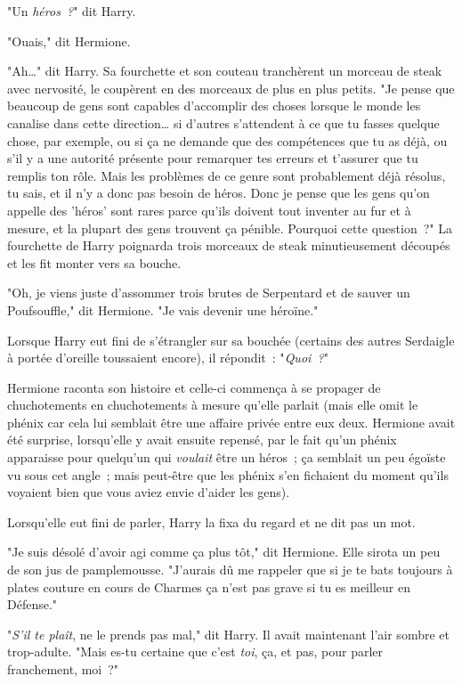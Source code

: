 "Un \emph{héros~?}" dit Harry.

"Ouais," dit Hermione.

"Ah…" dit Harry. Sa fourchette et son couteau tranchèrent un morceau de steak avec nervosité, le coupèrent en des morceaux de plus en plus petits. "Je pense que beaucoup de gens sont capables d'accomplir des choses lorsque le monde les canalise dans cette direction… si d'autres s'attendent à ce que tu fasses quelque chose, par exemple, ou si ça ne demande que des compétences que tu as déjà, ou s'il y a une autorité présente pour remarquer tes erreurs et t'assurer que tu remplis ton rôle. Mais les problèmes de ce genre sont probablement déjà résolus, tu sais, et il n'y a donc pas besoin de héros. Donc je pense que les gens qu'on appelle des 'héros' sont rares parce qu'ils doivent tout inventer au fur et à mesure, et la plupart des gens trouvent ça pénible. Pourquoi cette question~?" La fourchette de Harry poignarda trois morceaux de steak minutieusement découpés et les fit monter vers sa bouche.

"Oh, je viens juste d'assommer trois brutes de Serpentard et de sauver un Poufsouffle," dit Hermione. "Je vais devenir une héroïne."

Lorsque Harry eut fini de s'étrangler sur sa bouchée (certains des autres Serdaigle à portée d'oreille toussaient encore), il répondit~: "\emph{Quoi~?}"

Hermione raconta son histoire et celle-ci commença à se propager de chuchotements en chuchotements à mesure qu'elle parlait (mais elle omit le phénix car cela lui semblait être une affaire privée entre eux deux. Hermione avait été surprise, lorsqu'elle y avait ensuite repensé, par le fait qu'un phénix apparaisse pour quelqu'un qui \emph{voulait} être un héros~; ça semblait un peu égoïste vu sous cet angle~; mais peut-être que les phénix s'en fichaient du moment qu'ils voyaient bien que vous aviez envie d'aider les gens).

Lorsqu'elle eut fini de parler, Harry la fixa du regard et ne dit pas un mot.

"Je suis désolé d'avoir agi comme ça plus tôt," dit Hermione. Elle sirota un peu de son jus de pamplemousse. "J'aurais dû me rappeler que si je te bats toujours à plates couture en cours de Charmes ça n'est pas grave si tu es meilleur en Défense."

"\emph{S'il te plaît}, ne le prends pas mal," dit Harry. Il avait maintenant l'air sombre et trop-adulte. "Mais es-tu certaine que c'est \emph{toi}, ça, et pas, pour parler franchement, moi~?"

